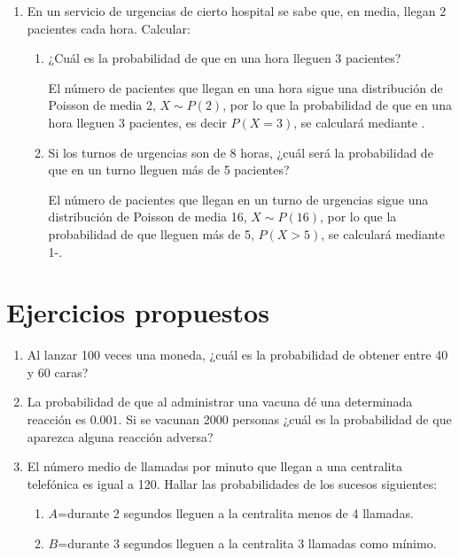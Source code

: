 \begin{enumerate}[leftmargin=*]
\item En un servicio de urgencias de cierto hospital se sabe que, en media, llegan 2 pacientes cada hora. Calcular:

\begin{enumerate}

\item ¿Cuál es la probabilidad de que en una hora lleguen 3 pacientes?
\begin{indicacion}
El número de pacientes que llegan en una hora sigue una distribución de Poisson de media 2, $X\sim P(2)$, por lo que la probabilidad de que en una hora lleguen 3 pacientes, es decir $P(X=3)$, se calculará mediante .
\end{indicacion}

\item Si los turnos de urgencias son de 8 horas, ¿cuál será la probabilidad de que en un turno lleguen más de 5 pacientes?
\begin{indicacion}
El número de pacientes que llegan en un turno de urgencias sigue una distribución de Poisson de media 16,  $X\sim P(16)$, por lo que la probabilidad de que lleguen más de 5, $P(X>5)$, se calculará mediante 1-.
\end{indicacion}


\end{enumerate}

\end{enumerate}


\section{Ejercicios propuestos}
\begin{enumerate}[leftmargin=*]


\item Al lanzar 100 veces una moneda, ¿cuál es la probabilidad de obtener entre 40 y 60 caras?

\item La probabilidad de que al administrar una vacuna dé una determinada reacción es $0.001$. Si se vacunan 2000 personas ¿cuál es la probabilidad de que aparezca alguna reacción adversa?

\item El número medio de llamadas por minuto que llegan a una centralita telefónica es igual a 120. Hallar las probabilidades de los sucesos siguientes:
\begin{enumerate}

\item $A$=durante 2 segundos lleguen a la centralita menos de 4 llamadas.

\item $B$=durante 3 segundos lleguen a la centralita 3 llamadas como mínimo.

\end{enumerate}
\end{enumerate}







